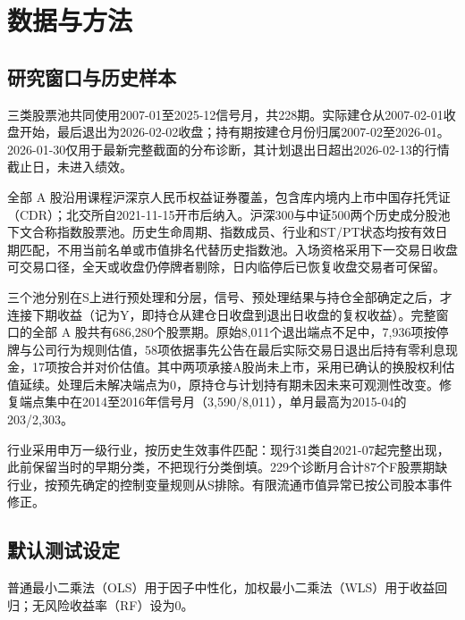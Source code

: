 \section{数据与方法}
\subsection{研究窗口与历史样本}
三类股票池共同使用2007-01至2025-12信号月，共228期。实际建仓从2007-02-01收盘开始，最后退出为2026-02-02收盘；持有期按建仓月份归属2007-02至2026-01。2026-01-30仅用于最新完整截面的分布诊断，其计划退出日超出2026-02-13的行情截止日，未进入绩效。

全部 A 股沿用课程沪深京人民币权益证券覆盖，包含库内境内上市中国存托凭证（CDR）；北交所自2021-11-15开市后纳入。沪深300与中证500两个历史成分股池下文合称指数股票池。历史生命周期、指数成员、行业和ST/PT状态均按有效日期匹配，不用当前名单或市值排名代替历史指数池。入场资格采用下一交易日收盘可交易口径，全天或收盘仍停牌者剔除，日内临停后已恢复收盘交易者可保留。

三个池分别在S上进行预处理和分层，信号、预处理结果与持仓全部确定之后，才连接下期收益（记为Y，即持仓从建仓日收盘到退出日收盘的复权收益）。完整窗口的全部 A 股共有686,280个股票期。原始8,011个退出端点不足中，7,936项按停牌与公司行为规则估值，58项依据事先公告在最后实际交易日退出后持有零利息现金，17项按合并对价估值。其中两项承接A股尚未上市，采用已确认的换股权利估值延续。处理后未解决端点为0，原持仓与计划持有期未因未来可观测性改变。修复端点集中在2014至2016年信号月（3,590/8,011），单月最高为2015-04的203/2,303。

行业采用申万一级行业，按历史生效事件匹配：现行31类自2021-07起完整出现，此前保留当时的早期分类，不把现行分类倒填。229个诊断月合计87个F股票期缺行业，按预先确定的控制变量规则从S排除。有限流通市值异常已按公司股本事件修正。

\subsection{默认测试设定}
普通最小二乘法（OLS）用于因子中性化，加权最小二乘法（WLS）用于收益回归；无风险收益率（RF）设为0。

